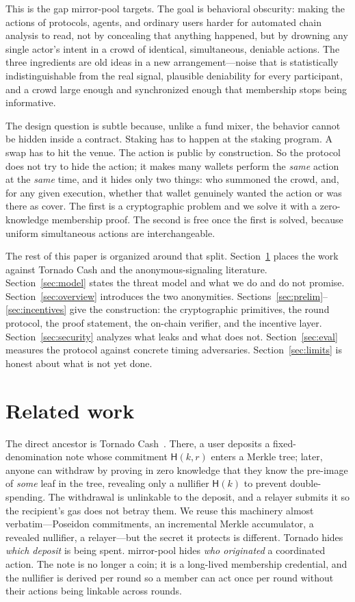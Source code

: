 \documentclass[11pt]{article}
\newcommand{\hash}{\mathsf{H}}
\begin{document}
This is the gap mirror-pool targets. The goal is behavioral obscurity: making the
actions of protocols, agents, and ordinary users harder for automated chain
analysis to read, not by concealing that anything happened, but by drowning any
single actor's intent in a crowd of identical, simultaneous, deniable actions.
The three ingredients are old ideas in a new arrangement---noise that is
statistically indistinguishable from the real signal, plausible deniability for
every participant, and a crowd large enough and synchronized enough that
membership stops being informative.

The design question is subtle because, unlike a fund mixer, the behavior cannot
be hidden inside a contract. Staking has to happen at the staking program.
A swap has to hit the venue. The action is public by construction. So the
protocol does not try to hide the action; it makes many wallets perform the
\emph{same} action at the \emph{same} time, and it hides only two things: who
summoned the crowd, and, for any given execution, whether that wallet genuinely
wanted the action or was there as cover. The first is a cryptographic problem and
we solve it with a zero-knowledge membership proof. The second is free once the
first is solved, because uniform simultaneous actions are interchangeable.

The rest of this paper is organized around that split. Section~\ref{sec:related}
places the work against Tornado Cash and the anonymous-signaling literature.
Section~\ref{sec:model} states the threat model and what we do and do not
promise. Section~\ref{sec:overview} introduces the two anonymities.
Sections~\ref{sec:prelim}--\ref{sec:incentives} give the construction: the
cryptographic primitives, the round protocol, the proof statement, the on-chain
verifier, and the incentive layer. Section~\ref{sec:security} analyzes what leaks
and what does not. Section~\ref{sec:eval} measures the protocol against concrete
timing adversaries. Section~\ref{sec:limits} is honest about what is not yet done.

\section{Related work}
\label{sec:related}

The direct ancestor is Tornado Cash~\cite{tornado}. There, a user deposits a
fixed-denomination note whose commitment $\hash(k,r)$ enters a Merkle tree; later,
anyone can withdraw by proving in zero knowledge that they know the pre-image of
\emph{some} leaf in the tree, revealing only a nullifier $\hash(k)$ to prevent
double-spending. The withdrawal is unlinkable to the deposit, and a relayer
submits it so the recipient's gas does not betray them. We reuse this machinery
almost verbatim---Poseidon commitments, an incremental Merkle accumulator, a
revealed nullifier, a relayer---but the secret it protects is different. Tornado
hides \emph{which deposit} is being spent. mirror-pool hides \emph{who
originated} a coordinated action. The note is no longer a coin; it is a long-lived
membership credential, and the nullifier is derived per round so a member can act
once per round without their actions being linkable across rounds.
\end{document}
